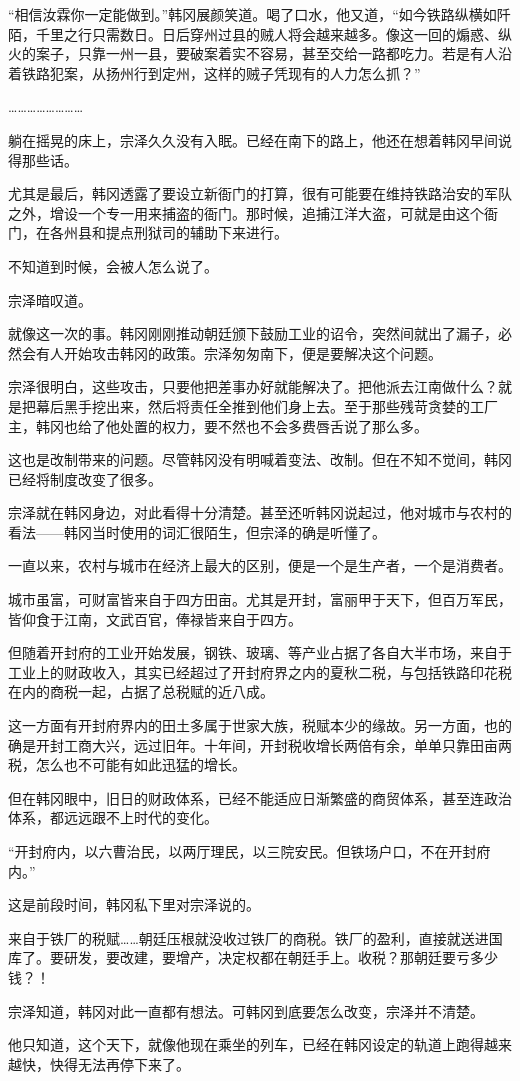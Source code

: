“相信汝霖你一定能做到。”韩冈展颜笑道。喝了口水，他又道，“如今铁路纵横如阡陌，千里之行只需数日。日后穿州过县的贼人将会越来越多。像这一回的煽惑、纵火的案子，只靠一州一县，要破案着实不容易，甚至交给一路都吃力。若是有人沿着铁路犯案，从扬州行到定州，这样的贼子凭现有的人力怎么抓？”

……………………

躺在摇晃的床上，宗泽久久没有入眠。已经在南下的路上，他还在想着韩冈早间说得那些话。

尤其是最后，韩冈透露了要设立新衙门的打算，很有可能要在维持铁路治安的军队之外，增设一个专一用来捕盗的衙门。那时候，追捕江洋大盗，可就是由这个衙门，在各州县和提点刑狱司的辅助下来进行。

不知道到时候，会被人怎么说了。

宗泽暗叹道。

就像这一次的事。韩冈刚刚推动朝廷颁下鼓励工业的诏令，突然间就出了漏子，必然会有人开始攻击韩冈的政策。宗泽匆匆南下，便是要解决这个问题。

宗泽很明白，这些攻击，只要他把差事办好就能解决了。把他派去江南做什么？就是把幕后黑手挖出来，然后将责任全推到他们身上去。至于那些残苛贪婪的工厂主，韩冈也给了他处置的权力，要不然也不会多费唇舌说了那么多。

这也是改制带来的问题。尽管韩冈没有明喊着变法、改制。但在不知不觉间，韩冈已经将制度改变了很多。

宗泽就在韩冈身边，对此看得十分清楚。甚至还听韩冈说起过，他对城市与农村的看法——韩冈当时使用的词汇很陌生，但宗泽的确是听懂了。

一直以来，农村与城市在经济上最大的区别，便是一个是生产者，一个是消费者。

城市虽富，可财富皆来自于四方田亩。尤其是开封，富丽甲于天下，但百万军民，皆仰食于江南，文武百官，俸禄皆来自于四方。

但随着开封府的工业开始发展，钢铁、玻璃、等产业占据了各自大半市场，来自于工业上的财政收入，其实已经超过了开封府界之内的夏秋二税，与包括铁路印花税在内的商税一起，占据了总税赋的近八成。

这一方面有开封府界内的田土多属于世家大族，税赋本少的缘故。另一方面，也的确是开封工商大兴，远过旧年。十年间，开封税收增长两倍有余，单单只靠田亩两税，怎么也不可能有如此迅猛的增长。

但在韩冈眼中，旧日的财政体系，已经不能适应日渐繁盛的商贸体系，甚至连政治体系，都远远跟不上时代的变化。

“开封府内，以六曹治民，以两厅理民，以三院安民。但铁场户口，不在开封府内。”

这是前段时间，韩冈私下里对宗泽说的。

来自于铁厂的税赋……朝廷压根就没收过铁厂的商税。铁厂的盈利，直接就送进国库了。要研发，要改建，要增产，决定权都在朝廷手上。收税？那朝廷要亏多少钱？！

宗泽知道，韩冈对此一直都有想法。可韩冈到底要怎么改变，宗泽并不清楚。

他只知道，这个天下，就像他现在乘坐的列车，已经在韩冈设定的轨道上跑得越来越快，快得无法再停下来了。

